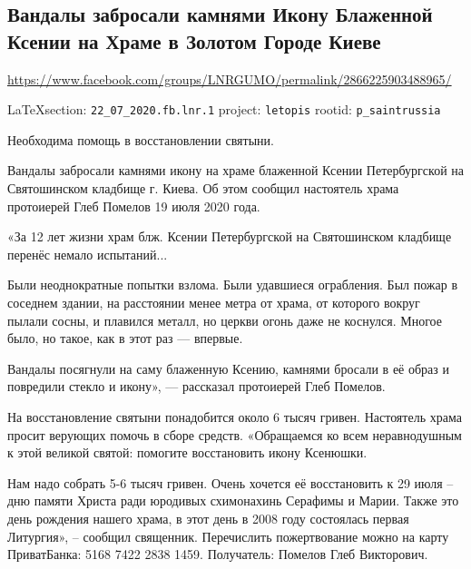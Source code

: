  
 

\subsection{Вандалы забросали камнями Икону Блаженной Ксении на Храме в Золотом Городе Киеве}
\label{sec:22_07_2020.fb.lnr.1}
\url{https://www.facebook.com/groups/LNRGUMO/permalink/2866225903488965/}

\vspace{0.5cm}
{\small\LaTeX section: \verb|22_07_2020.fb.lnr.1| project: \verb|letopis| rootid: \verb|p_saintrussia|}
\vspace{0.5cm}

Необходима помощь в восстановлении святыни.

Вандалы забросали камнями икону на храме блаженной Ксении Петербургской на
Святошинском кладбище г. Киева.  Об этом сообщил настоятель храма протоиерей
Глеб Помелов 19 июля 2020 года.

«За 12 лет жизни храм блж. Ксении Петербургской на Святошинском кладбище
перенёс немало испытаний...

Были неоднократные попытки взлома.  Были удавшиеся ограбления. Был пожар в
соседнем здании, на расстоянии менее метра от храма, от которого вокруг пылали
сосны, и плавился металл, но церкви огонь даже не коснулся.  Многое было, но
такое, как в этот раз --- впервые.

Вандалы посягнули на саму блаженную Ксению, камнями бросали в её образ и
повредили стекло и икону», --- рассказал протоиерей Глеб Помелов.

На восстановление святыни понадобится около 6 тысяч гривен. Настоятель храма
просит верующих помочь в сборе средств.  «Обращаемся ко всем неравнодушным к
этой великой святой: помогите восстановить икону Ксенюшки.

Нам надо собрать 5-6 тысяч гривен. Очень хочется её восстановить к 29 июля –
дню памяти Христа ради юродивых схимонахинь Серафимы и Марии.  Также это день
рождения нашего храма, в этот день в 2008 году состоялась первая Литургия», –
сообщил священник.  Перечислить пожертвование можно на карту ПриватБанка: 5168
7422 2838 1459.  Получатель: Помелов Глеб Викторович.
  
